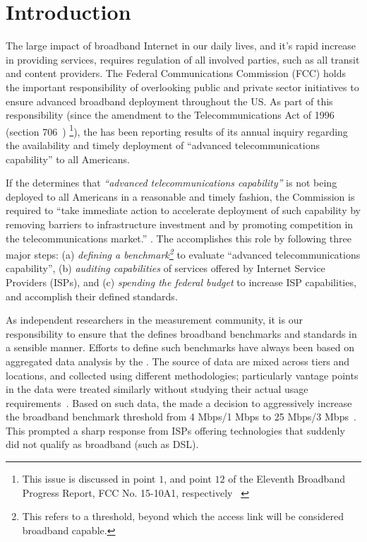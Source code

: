 \section{Introduction}
\label{sec:intro}



The large impact of broadband Internet in our daily lives, and it’s rapid increase in providing
services, requires regulation of all involved parties, such as all transit and content providers.
The Federal Communications Commission (FCC) holds the important responsibility of overlooking public
and private sector initiatives to ensure advanced broadband deployment throughout the US. As part of
this responsibility (since the amendment to the Telecommunications Act of 1996 (section 706~\cite{fcc1996telecom-act})
\footnote{This issue is discussed in point $1$, and point $12$ of the Eleventh Broadband Progress Report,
FCC No. 15-10A1, respectively ~\cite{fcc2015progress-report}\label{foot:fcc-issues}}), 
the \FCC has been reporting results of its annual inquiry regarding the
availability and timely deployment of ``advanced telecommunications capability'' to all Americans.


If the \FCC determines that \emph{``advanced telecommunications capability''} is not being deployed
to all Americans in a reasonable and timely fashion, the Commission is required to ``take immediate
action to accelerate deployment of such capability by removing barriers to infrastructure investment
and by promoting competition in the telecommunications market.'' .
The \FCC accomplishes this role by following three major steps:
(a) \emph{defining a benchmark\footnote{This refers to a threshold, beyond which the access link will be considered broadband capable.}} to evaluate ``advanced telecommunications capability'', (b) \emph{auditing
capabilities} of services offered by Internet Service Providers (ISPs), and (c) \emph{spending the
federal budget} to increase ISP capabilities, and accomplish their defined standards.

As independent researchers in the measurement community, it is our responsibility to ensure that the
\FCC defines broadband benchmarks and standards in a sensible manner. Efforts to define such
benchmarks have always been based on aggregated data analysis by the \FCC. The source of data are
mixed across tiers and locations, and collected using different methodologies; particularly vantage
points in the data were treated similarly without studying their actual usage
requirements~\cite{fcc2015progress-report}. Based on such data, the \FCC made a decision to aggressively increase the broadband benchmark threshold from 4 Mbps/1 Mbps to 25 Mbps/3 Mbps~\cite{fcc-redefine-ieee}. This prompted a sharp response from ISPs offering technologies that suddenly did not qualify as broadband (such as DSL).

